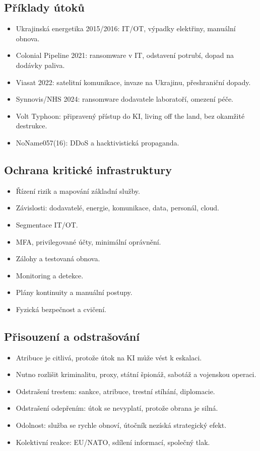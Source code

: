 \documentclass[10pt,a4paper]{article}
\newcommand{\blok}[1]{\subsection*{#1}}
\begin{document}
\blok{Příklady útoků}
\begin{itemize}
  \item Ukrajinská energetika 2015/2016: IT/OT, výpadky elektřiny, manuální obnova.
  \item Colonial Pipeline 2021: ransomware v IT, odstavení potrubí, dopad na dodávky paliva.
  \item Viasat 2022: satelitní komunikace, invaze na Ukrajinu, přeshraniční dopady.
  \item Synnovis/NHS 2024: ransomware dodavatele laboratoří, omezení péče.
  \item Volt Typhoon: připravený přístup do KI, living off the land, bez okamžité destrukce.
  \item NoName057(16): DDoS a hacktivistická propaganda.
\end{itemize}

\blok{Ochrana kritické infrastruktury}
\begin{itemize}
  \item Řízení rizik a mapování základní služby.
  \item Závislosti: dodavatelé, energie, komunikace, data, personál, cloud.
  \item Segmentace IT/OT.
  \item MFA, privilegované účty, minimální oprávnění.
  \item Zálohy a testovaná obnova.
  \item Monitoring a detekce.
  \item Plány kontinuity a manuální postupy.
  \item Fyzická bezpečnost a cvičení.
\end{itemize}

\blok{Přisouzení a odstrašování}
\begin{itemize}
  \item Atribuce je citlivá, protože útok na KI může vést k eskalaci.
  \item Nutno rozlišit kriminalitu, proxy, státní špionáž, sabotáž a vojenskou operaci.
  \item Odstrašení trestem: sankce, atribuce, trestní stíhání, diplomacie.
  \item Odstrašení odepřením: útok se nevyplatí, protože obrana je silná.
  \item Odolnost: služba se rychle obnoví, útočník nezíská strategický efekt.
  \item Kolektivní reakce: EU/NATO, sdílení informací, společný tlak.
\end{itemize}
\end{document}

